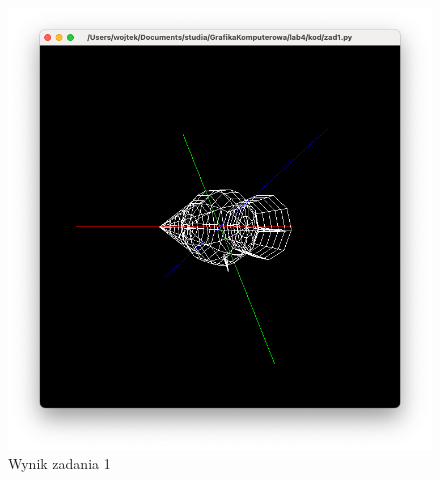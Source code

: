 \documentclass[]{article}
\begin{document}
\begin{figure}[H]

	\centering
	\includegraphics[width=\textwidth]{zad1.png}
	\caption{Wynik zadania 1}
\end{figure}
\end{document}
